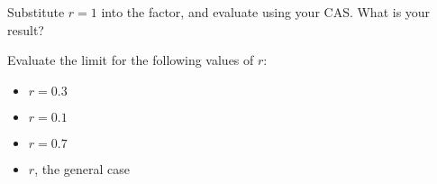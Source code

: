 \documentclass{ximera}
\begin{document}
\begin{question}
Substitute $r = 1$ into the factor, and evaluate using your CAS. What is your result?
\begin{onlineOnly}
\begin{sageCell}

\end{sageCell}
\end{onlineOnly}

\begin{multipleChoice}
\choice{$\infty$}
\choice{$\pi$}
\end{multipleChoice}

Evaluate the limit for the following values of $r$:
\begin{itemize}
\item $r = 0.3$
\begin{multipleChoice}
\end{multipleChoice}
\item $r = 0.1$
\begin{multipleChoice}
\end{multipleChoice}
\item $r = 0.7$
\begin{multipleChoice}
\end{multipleChoice}
\item $r$, the general case
\begin{multipleChoice}
\end{multipleChoice}
\end{itemize}
\end{question}
\end{document}
